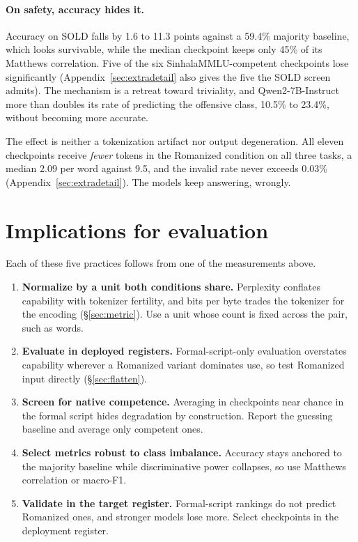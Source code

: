 \documentclass{article}
\begin{document}
\paragraph{On safety, accuracy hides it.} Accuracy on SOLD falls by 1.6 to 11.3 points
against a 59.4\% majority baseline, which looks survivable, while the median checkpoint
keeps only 45\% of its Matthews correlation. Five of the six SinhalaMMLU-competent
checkpoints lose significantly (Appendix~\ref{sec:extradetail} also gives the five the
SOLD screen admits). The mechanism is a retreat toward triviality, and
Qwen2-7B-Instruct more than doubles its rate of predicting the offensive class, 10.5\%
to 23.4\%, without becoming more accurate.

The effect is neither a tokenization artifact nor output degeneration. All eleven
checkpoints receive \emph{fewer} tokens in the Romanized condition on all three tasks, a
median 2.09 per word against 9.5, and the invalid rate never exceeds 0.03\%
(Appendix~\ref{sec:extradetail}). The models keep answering, wrongly.

\section{Implications for evaluation}
\label{sec:lessons}

Each of these five practices follows from one of the measurements above.
\begin{enumerate}[leftmargin=1.4em,itemsep=1pt,topsep=2pt]
\item \textbf{Normalize by a unit both conditions share.} Perplexity conflates capability with tokenizer fertility, and bits per byte trades the tokenizer for the encoding (\S\ref{sec:metric}). Use a unit whose count is fixed across the pair, such as words.
\item \textbf{Evaluate in deployed registers.} Formal-script-only evaluation overstates capability wherever a Romanized variant dominates use, so test Romanized input directly (\S\ref{sec:flatten}).
\item \textbf{Screen for native competence.} Averaging in checkpoints near chance in the formal script hides degradation by construction. Report the guessing baseline and average only competent ones.
\item \textbf{Select metrics robust to class imbalance.} Accuracy stays anchored to the majority baseline while discriminative power collapses, so use Matthews correlation or macro-F1.
\item \textbf{Validate in the target register.} Formal-script rankings do not predict Romanized ones, and stronger models lose more. Select checkpoints in the deployment register.
\end{enumerate}
\end{document}
